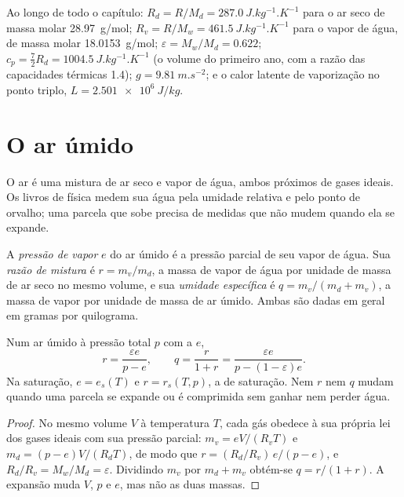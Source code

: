 Ao longo de todo o capítulo: $R_d = R/M_d = \qty{287.0}{J.kg^{-1}.K^{-1}}$ para o ar seco de massa molar
\qty{28.97}{g/mol}; $R_v = R/M_w = \qty{461.5}{J.kg^{-1}.K^{-1}}$ para o vapor de água, de massa
molar \qty{18.0153}{g/mol}; $\varepsilon = M_w/M_d = 0.622$; $c_p = \tfrac72 R_d =
\qty{1004.5}{J.kg^{-1}.K^{-1}}$ (o volume do primeiro ano, com a razão das capacidades térmicas 1.4);
$g = \qty{9.81}{m.s^{-2}}$; e o calor latente de vaporização no ponto triplo,
$L = \qty{2.501e6}{J/kg}$.

\section{O ar úmido}\label{sec:b2:atmospheric-thermodynamics:moist-air}

O ar é uma mistura de ar seco e vapor de água, ambos próximos de gases ideais. Os livros de física
medem sua água pela umidade relativa e pelo ponto de orvalho; uma parcela que sobe precisa de medidas
que não mudem quando ela se expande.

\begin{definition}\label{def:b2:atmospheric-thermodynamics:moist-air}
A \emph{pressão de vapor} $e$ do ar úmido é a pressão parcial de
seu vapor de água. Sua \emph{razão de mistura} é $r = m_v/m_d$, a massa de vapor
de água por unidade de massa de ar seco no mesmo volume, e sua \emph{umidade
específica} é $q = m_v/(m_d + m_v)$, a massa de vapor por unidade de massa de
ar úmido. Ambas são dadas em geral em gramas por quilograma.
\end{definition}

\begin{proposition}\label{prop:b2:atmospheric-thermodynamics:humidity}
Num ar úmido à pressão total $p$ com a  $e$,
\[
  r = \frac{\varepsilon e}{p - e}, \qquad q = \frac{r}{1 + r} = \frac{\varepsilon e}{p - (1 -
  \varepsilon)e} .
\]
Na saturação, $e = e_s(T)$ e $r = r_s(T, p)$, a  de saturação. Nem $r$ nem
$q$ mudam quando uma parcela se expande ou é comprimida sem ganhar nem perder água.
\end{proposition}

\begin{proof}
No mesmo volume $V$ à temperatura $T$, cada gás obedece à sua própria lei dos gases ideais com sua
pressão parcial: $m_v = eV/(R_vT)$ e $m_d = (p - e)V/(R_dT)$, de modo que $r = (R_d/R_v)\,e/(p - e)$,
e $R_d/R_v = M_w/M_d = \varepsilon$. Dividindo $m_v$ por $m_d + m_v$ obtém-se $q = r/(1 + r)$.
A expansão muda $V$, $p$ e $e$, mas não as duas massas.
\end{proof}

